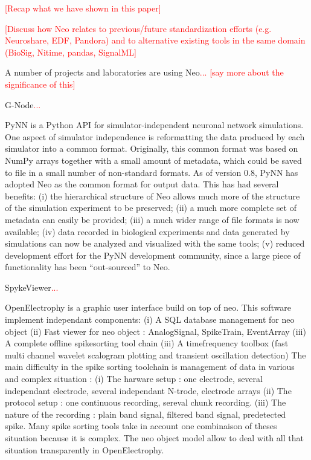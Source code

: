 \documentclass{frontiers}
\newcommand{\missing}[1]{\textcolor{red}{#1}}
\begin{document}
\missing{[Recap what we have shown in this paper]}

\missing{[Discuss how Neo relates to previous/future standardization efforts (e.g. Neuroshare, EDF, Pandora) and to alternative existing tools in the same domain (BioSig, Nitime, pandas, SignalML]}

  


A number of projects and laboratories are using Neo\missing{... [say more about the significance of this]}

G-Node\missing{...}

PyNN \citep{Davison2009} is a Python API for simulator-independent neuronal network simulations.
One aspect of simulator independence is reformatting the data produced by each simulator into a common format.
Originally, this common format was based on NumPy arrays together with a small amount of metadata, which could be saved to file in a small number of non-standard formats.
As of version 0.8, PyNN has adopted Neo as the common format for output data.
This has had several benefits:
  (i)   the hierarchical structure of Neo allows much more of the structure of the simulation experiment to be preserved;
  (ii)  a much more complete set of metadata can easily be provided;
  (iii) a much wider range of file formats is now available;
  (iv)  data recorded in biological experiments and data generated by simulations can now be analyzed and visualized with the same tools; 
  (v)   reduced development effort for the PyNN development community, since a large piece of functionality has been ``out-sourced'' to Neo.

SpykeViewer\missing{...}

OpenElectrophy \citep{Garcia2009} is a graphic user interface build on top of neo. This software implement independant components:
   (i) A SQL database management for neo object
   (ii) Fast viewer for neo object : AnalogSignal, SpikeTrain, EventArray
   (iii) A complete offline spikesorting tool chain
   (iii) A timefrequency toolbox (fast multi channel wavelet scalogram plotting and  transient oscillation detection)
The main difficulty in the spike sorting toolchain is management of data in various and complex situation : 
   (i) The harware setup : one electrode, several independant electrode, several independant N-trode, electrode arrays
   (ii) The protocol setup : one continuous recording, sereval chunk recording.
   (iii) The nature of the recording : plain band signal, filtered band signal, predetected spike.
Many spike sorting tools take in account one combinaison of theses situation because it is complex. The neo object model allow to deal with all that situation transparently in OpenElectrophy.
\end{document}
